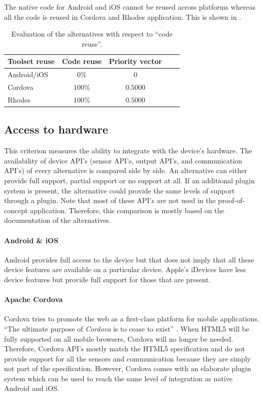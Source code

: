 The native code for Android and iOS cannot be reused across platforms whereas all the code is reused in Cordova and Rhodes application. This is shown in . 

\begin{table}[h!]
    \centering
    \begin{tabular}{lcccl}
        \hline
        \textbf{Toolset reuse} & Code reuse & Priority vector \\
        \hline
        Android/iOS            & $0\%$       & $0$            \\
        Cordova                & $100\%$     & $0.5000$       \\
        Rhodes                 & $100\%$     & $0.5000$       \\
        \hline
    \end{tabular}
    \caption{Evaluation of the alternatives with respect to ``code reuse''.}
    \label{tab:cr}
\end{table}

\subsection{Access to hardware}

This criterion measures the ability to integrate with the device's hardware. The availability of device API's (sensor API's, output API's, and communication API's) of every alternative is compared side by side. An alternative can either provide full support, partial support or no support at all. If an additional plugin system is present, the alternative could provide the same levels of support through a plugin. Note that most of these API's are not used in the proof-of-concept application. Therefore, this comparison is mostly based on the documentation of the alternatives.

\paragraph{Android \& iOS} Android provides full access to the device but that does not imply that all these device features are available on a particular device. Apple's iDevices have less device features but provide full support for those that are present.

\paragraph{Apache Cordova} Cordova tries to promote the web as a first-class platform for mobile applications. ``The ultimate purpose of \emph{Cordova} is to cease to exist'' \cite{LeRoux:2012}. When HTML5 will be fully supported on all mobile browsers, Cordova will no longer be needed. Therefore, Cordova API's mostly match the HTML5 specification and do not provide support for all the sensors and communication because they are simply not part of the specification. However, Cordova comes with an elaborate plugin system which can be used to reach the same level of integration as native Android and iOS. 

